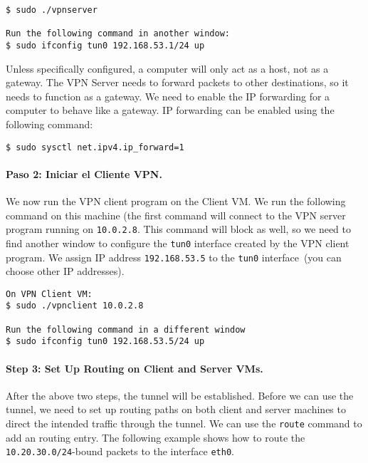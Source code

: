 \begin{lstlisting}
$ sudo ./vpnserver

Run the following command in another window:
$ sudo ifconfig tun0 192.168.53.1/24 up
\end{lstlisting}

Unless specifically configured, a computer will only act as a host,
not as a gateway. The VPN Server needs to forward packets to other destinations,
so it needs to function as a gateway. We need to
enable the IP forwarding for a computer to behave like a gateway.
IP forwarding can be enabled
using the following command:

\begin{lstlisting}
$ sudo sysctl net.ipv4.ip_forward=1
\end{lstlisting}



\paragraph{Paso 2: Iniciar el Cliente VPN.} 
We now run the VPN client program on the Client
VM.  We run the following command on this machine (the first command
will connect to the VPN server program running on {\tt 10.0.2.8}.
This command will block as well, so we need to find another window to
configure the \texttt{tun0} interface created by the VPN client program.
We assign IP address \texttt{192.168.53.5} to the \texttt{tun0} interface~(you
can choose other IP addresses).


\begin{lstlisting}
On VPN Client VM:
$ sudo ./vpnclient 10.0.2.8

Run the following command in a different window
$ sudo ifconfig tun0 192.168.53.5/24 up
\end{lstlisting}



\paragraph{Step 3: Set Up Routing on Client and Server VMs.}
After the above two steps, the tunnel will be established.
Before we can use the tunnel, we need to set up routing
paths on both client and server machines to direct the intended traffic through
the tunnel. 
We can use the \texttt{route} command to add an routing entry. The
following example shows how to route the \texttt{10.20.30.0/24}-bound
packets to the interface \texttt{eth0}.

